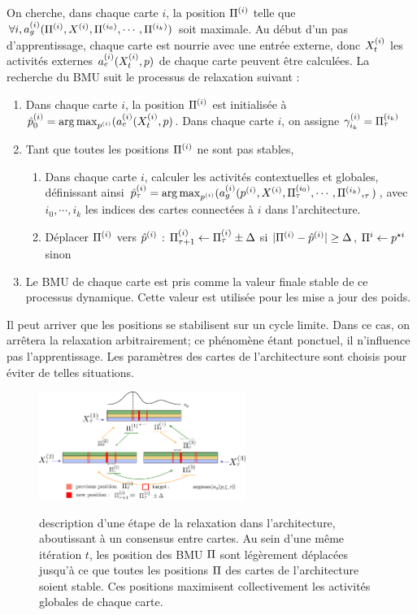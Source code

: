 On cherche, dans chaque carte $i$, la position $\Pi^{({i})}$ telle que $\forall i, a_g^{({i})}(\Pi^{({i})},X^{({i})},\Pi^{({i_0})},\cdots,\Pi^{({i_k})})$ soit maximale.
Au début d'un pas d'apprentissage, chaque carte est nourrie avec une entrée externe, donc $X^{({i})}_t$ les activités externes $a_e^{({i})}(X^{({i})}_t,p)$ de chaque carte peuvent être calculées.
La recherche du BMU suit le processus de relaxation suivant :
\begin{enumerate}
\item Dans chaque carte $i$, la position $\Pi^{({i})}$ est initialisée à $\hat{p}^{({i})}_0 = \operatorname*{arg\,max}_{p^{({i})}}(a_e^{({i})}(X^{({i})}_t,p)$. Dans chaque carte $i$, on assigne $\gamma_{i_k}^{({i})} = \Pi^{({i_k})}_\tau$
\item Tant que toutes les positions $\Pi^{({i})}$ ne sont pas stables, 
	\begin{enumerate}
	\item Dans chaque carte $i$, calculer les activités contextuelles et globales, définissant ainsi $\hat{p}^{({i})}_\tau = \operatorname*{arg\,max}_{p^{({i})}}(a_g^{({i})}(p^{({i})},X^{({i})}, \Pi^{({i_0})}_\tau,\cdots,\Pi^{({i_k})},_\tau)$, avec $i_0, \cdots, i_k$ les indices des cartes connectées à $i$ dans l'architecture.
	\item Déplacer $\Pi^{({i})}$ vers $\hat{p}^{({i})}$ : $\Pi^{({i})}_{\tau +1} \leftarrow \Pi^{({i})}_\tau \pm \Delta$ si $\lvert \Pi^{({i})}- \hat{p}^{({i})}\rvert \geq \Delta$, $\Pi^i \leftarrow p^{\star i}$ sinon
	\end{enumerate}
\item Le BMU de chaque carte est pris comme la valeur finale stable de ce processus dynamique. Cette valeur est utilisée pour les mise a jour des poids.
\end{enumerate}

Il peut arriver que les positions se stabilisent sur un cycle limite. Dans ce cas, on arrêtera la relaxation arbitrairement; ce phénomène étant ponctuel, il n'influence pas l'apprentissage. Les paramètres des cartes de l'architecture sont choisis pour éviter de telles situations.

\begin{figure}
\centering
\includegraphics[width=0.6\textwidth]{relaxation.pdf}
\label{fig:relax}
\caption{description d'une étape de la relaxation dans l'architecture, aboutissant à un consensus entre cartes. Au sein d'une même itération $t$, les position des BMU $\Pi$ sont légèrement déplacées jusqu'à ce que toutes les positions $\Pi$ des cartes de l'architecture soient stable. Ces positions maximisent collectivement les activités globales de chaque carte. }
\end{figure}


